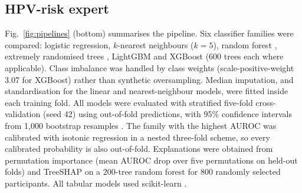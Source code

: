 \documentclass[lettersize,journal]{IEEEtran}
\begin{document}
\subsection{HPV-risk expert}
\label{sec:tabular}
Fig.~\ref{fig:pipelines} (bottom) summarises the pipeline. Six classifier families were compared: logistic regression, $k$-nearest neighbours ($k=5$), random forest \cite{breiman2001random}, extremely randomised trees \cite{geurts2006extremely}, LightGBM \cite{ke2017lightgbm} and XGBoost \cite{chen2016xgboost} (600 trees each where applicable). Class imbalance was handled by class weights (scale-positive-weight 3.07 for XGBoost) rather than synthetic oversampling. Median imputation, and standardisation for the linear and nearest-neighbour models, were fitted inside each training fold. All models were evaluated with stratified five-fold cross-validation (seed 42) using out-of-fold predictions, with 95\% confidence intervals from 1,000 bootstrap resamples \cite{efron1994bootstrap}. The family with the highest AUROC was calibrated with isotonic regression \cite{zadrozny2002transforming} in a nested three-fold scheme, so every calibrated probability is also out-of-fold. Explanations were obtained from permutation importance (mean AUROC drop over five permutations on held-out folds) and TreeSHAP \cite{lundberg2017unified,lundberg2020local} on a 200-tree random forest for 800 randomly selected participants. All tabular models used scikit-learn \cite{pedregosa2011scikit}.
\end{document}
